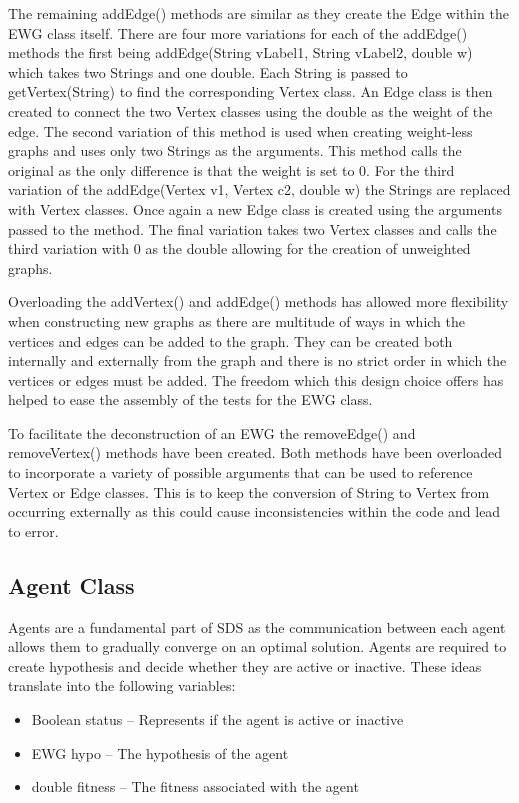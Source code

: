 \documentclass{AISB2008}
\begin{document}
The remaining addEdge() methods are similar as they create the Edge within the EWG class itself. There are four more variations for each of the addEdge() methods the first being addEdge(String vLabel1, String vLabel2, double w) which takes two Strings and one double. Each String is passed to getVertex(String) to find the corresponding Vertex class. An Edge class is then created to connect the two Vertex classes using the double as the weight of the edge. The second variation of this method is used when creating weight-less graphs and uses only two Strings as the arguments. This method calls the original as the only difference is that the weight is set to 0. For the third variation of the addEdge(Vertex v1, Vertex c2, double w) the Strings are replaced with Vertex classes. Once again a new Edge class is created using the arguments passed to the method. The final variation takes two Vertex classes and calls the third variation with 0 as the double allowing for the creation of unweighted graphs.

Overloading the addVertex() and addEdge() methods has allowed more flexibility when constructing new graphs as there are multitude of ways in which the vertices and edges can be added to the graph. They can be created both internally and externally from the graph and there is no strict order in which the vertices or edges must be added. The freedom which this design choice offers has helped to ease the assembly of the tests for the EWG class.

To facilitate the deconstruction of an EWG the removeEdge() and removeVertex() methods have been created. Both methods have been overloaded to incorporate a variety of possible arguments that can be used to reference Vertex or Edge classes. This is to keep the conversion of String to Vertex from occurring externally as this could cause inconsistencies within the code and lead to error.


\subsection{Agent Class}

Agents are a fundamental part of SDS as the communication between each agent allows them to gradually converge on an optimal solution. Agents are required to create hypothesis and decide whether they are active or inactive. These ideas translate into the following variables:

\begin{itemize}
\item Boolean status – Represents if the agent is active or inactive
\item EWG hypo – The hypothesis of the agent
\item double fitness – The fitness associated with the agent
\end{itemize}
\end{document}
